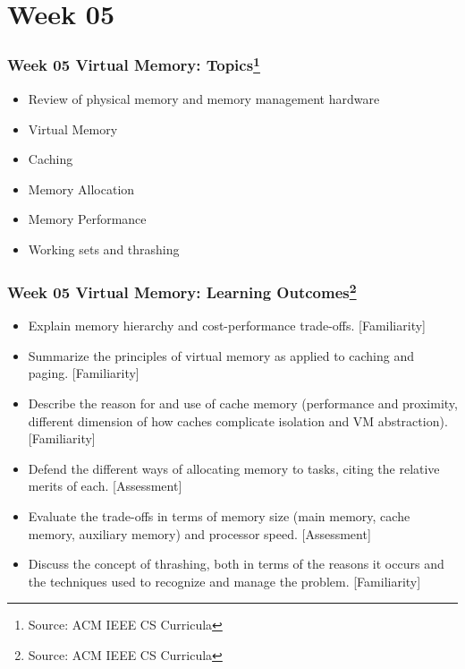 
\section{Week 05}
\begin{frame}[fragile]
\frametitle{Week 05 Virtual Memory:
Topics\footnote{Source: ACM IEEE CS Curricula}}

\begin{itemize}
\item Review of physical memory and memory management hardware 
\item Virtual Memory 
\item Caching 
\item Memory Allocation 
\item Memory Performance 
\item Working sets and thrashing 
\end{itemize}
\end{frame}

\begin{frame}[fragile]
\frametitle{Week 05 Virtual Memory:
Learning Outcomes\footnote{Source: ACM IEEE CS Curricula}}
\begin{itemize}
\item Explain memory hierarchy and cost-performance trade-offs. [Familiarity]
\item Summarize the principles of virtual memory as applied to caching and paging. [Familiarity] 
\item Describe the reason for and use of cache memory (performance and proximity, different dimension of how caches complicate isolation and VM abstraction). [Familiarity] 
\item Defend the different ways of allocating memory to tasks, citing the relative merits of each. [Assessment] 
\item Evaluate the trade-offs in terms of memory size (main memory, cache memory, auxiliary memory) and processor speed. [Assessment] 
\item Discuss the concept of thrashing, both in terms of the reasons it occurs and the techniques used to recognize and manage the problem. [Familiarity] 
\end{itemize}

\end{frame}

